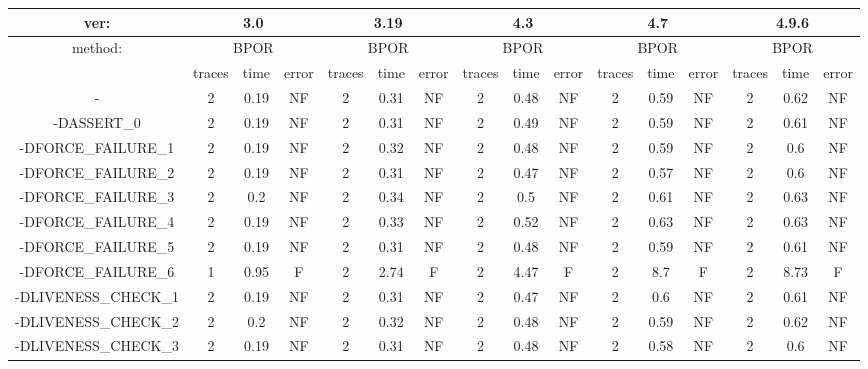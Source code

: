 \begin{tabular}{|c|c|c|c|c|c|c|c|c|c|c|c|c|c|c|c|}
\hline
\multicolumn{1}{|c|}{ver:} & \multicolumn{3}{c|}{3.0} & \multicolumn{3}{c|}{3.19} & \multicolumn{3}{c|}{4.3} & \multicolumn{3}{c|}{4.7} & \multicolumn{3}{c|}{4.9.6} \\
\hline
\multicolumn{1}{|c|}{method:} & \multicolumn{3}{c|}{BPOR} & \multicolumn{3}{c|}{BPOR} & \multicolumn{3}{c|}{BPOR} & \multicolumn{3}{c|}{BPOR} & \multicolumn{3}{c|}{BPOR} \\
\hline
   & traces & time & error & traces & time & error & traces & time & error & traces & time & error & traces & time & error \\
\hline
- & 2 & 0.19 & NF & 2 & 0.31 & NF & 2 & 0.48 & NF & 2 & 0.59 & NF & 2 & 0.62 & NF \\
\hline
-DASSERT\_0 & 2 & 0.19 & NF & 2 & 0.31 & NF & 2 & 0.49 & NF & 2 & 0.59 & NF & 2 & 0.61 & NF \\
\hline
-DFORCE\_FAILURE\_1 & 2 & 0.19 & NF & 2 & 0.32 & NF & 2 & 0.48 & NF & 2 & 0.59 & NF & 2 & 0.6 & NF \\
\hline
-DFORCE\_FAILURE\_2 & 2 & 0.19 & NF & 2 & 0.31 & NF & 2 & 0.47 & NF & 2 & 0.57 & NF & 2 & 0.6 & NF \\
\hline
-DFORCE\_FAILURE\_3 & 2 & 0.2 & NF & 2 & 0.34 & NF & 2 & 0.5 & NF & 2 & 0.61 & NF & 2 & 0.63 & NF \\
\hline
-DFORCE\_FAILURE\_4 & 2 & 0.19 & NF & 2 & 0.33 & NF & 2 & 0.52 & NF & 2 & 0.63 & NF & 2 & 0.63 & NF \\
\hline
-DFORCE\_FAILURE\_5 & 2 & 0.19 & NF & 2 & 0.31 & NF & 2 & 0.48 & NF & 2 & 0.59 & NF & 2 & 0.61 & NF \\
\hline
-DFORCE\_FAILURE\_6 & 1 & 0.95 & F & 2 & 2.74 & F & 2 & 4.47 & F & 2 & 8.7 & F & 2 & 8.73 & F \\
\hline
-DLIVENESS\_CHECK\_1 & 2 & 0.19 & NF & 2 & 0.31 & NF & 2 & 0.47 & NF & 2 & 0.6 & NF & 2 & 0.61 & NF \\
\hline
-DLIVENESS\_CHECK\_2 & 2 & 0.2 & NF & 2 & 0.32 & NF & 2 & 0.48 & NF & 2 & 0.59 & NF & 2 & 0.62 & NF \\
\hline
-DLIVENESS\_CHECK\_3 & 2 & 0.19 & NF & 2 & 0.31 & NF & 2 & 0.48 & NF & 2 & 0.58 & NF & 2 & 0.6 & NF \\
\hline
\end{tabular}
